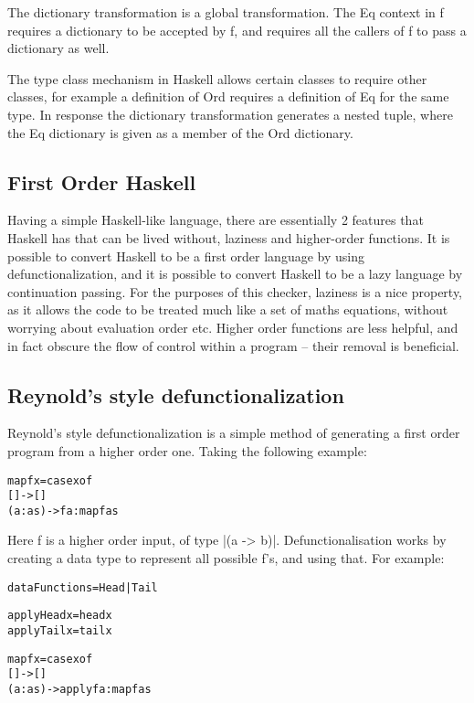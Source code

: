 \documentclass[preprint]{sigplanconf}
\newcommand{\C}[1]{\textsf{#1}}
\newenvironment{code}{\begin{alltt}\small}{\end{alltt}}
\begin{document}
The dictionary transformation is a global transformation. The \C{Eq} context in \C{f} requires a dictionary to be accepted by \C{f}, and requires all the callers of \C{f} to pass a dictionary as well.

The type class mechanism in Haskell allows certain classes to require other classes, for example a definition of \C{Ord} requires a definition of \C{Eq} for the same type. In response the dictionary transformation generates a nested tuple, where the \C{Eq} dictionary is given as a member of the \C{Ord} dictionary.

\subsection{First Order Haskell}

Having a simple Haskell-like language, there are essentially 2 features that Haskell has that can be lived without, laziness and higher-order functions. It is possible to convert Haskell to be a first order language by using defunctionalization, and it is possible to convert Haskell to be a lazy language by continuation passing. For the purposes of this checker, laziness is a nice property, as it allows the code to be treated much like a set of maths equations, without worrying about evaluation order etc. Higher order functions are less helpful, and in fact obscure the flow of control within a program -- their removal is beneficial.

\subsection{Reynold's style defunctionalization}

Reynold's style defunctionalization is a simple method of generating a first order program from a higher order one. Taking the following example:

\begin{code}
map f x = case x of
               [] -> []
               (a:as) -> f a : map f as
\end{code}

Here \C{f} is a higher order input, of type |(a -> b)|. Defunctionalisation works by creating a data type to represent all possible f's, and using that. For example:

\begin{code}
data Functions = Head | Tail

apply Head x = head x
apply Tail x = tail x

map f x = case x of
    [] -> []
    (a:as) -> apply f a : map f as
\end{code}
\end{document}
